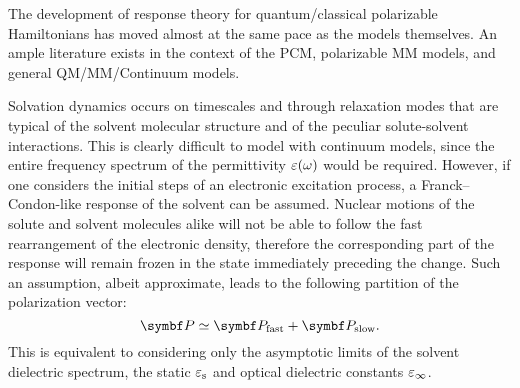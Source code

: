 The development of response theory for quantum/classical polarizable
Hamiltonians has moved almost at the same pace as the
models themselves.
An ample literature exists in the context of the
\acrshort{PCM},\autocite{Cammi1994-qj, Cammi1996-wf, Cammi1996-vx,
Cammi1999-rb, Cammi2003-qy, Frediani2005-nc, Ferrighi2010-pm}
polarizable \acrshort{MM} models,\autocite{Curutchet2009-bt, Olsen2010-wa,
Lipparini2012-hx, Lipparini2012-tl}
and general \acrshort{QM}/\acrshort{MM}/Continuum models.\autocite{Steindal2011-ki, Caprasecca2012-ir, Lipparini2013-ud}

 Solvation dynamics occurs on timescales and through
relaxation modes that are typical of the solvent molecular structure and of the
peculiar solute-solvent interactions.
This is clearly difficult to model with continuum models, since the
entire frequency spectrum of the permittivity $\varepsilon(\omega)$ would be
required.\autocite{Ingrosso2003-ev, Caricato2005-lo,
Mennucci2005-vi, Caricato2006-ba, Corni2015-pe}
However, if one considers the initial steps of an electronic excitation
process, a Franck--Condon-like response of the solvent can be assumed.
Nuclear motions of the solute and solvent molecules alike will not be able to
follow the fast rearrangement of the electronic density, therefore the
corresponding part of the response will remain frozen in the state
immediately preceding the change.
Such an assumption, albeit approximate, leads to the following partition
of the polarization vector:
\begin{equation}
 \vect{P} \simeq \vect{P}_\mathrm{fast} + \vect{P}_\mathrm{slow}.
\end{equation}
This is equivalent to considering only the asymptotic limits of the solvent
dielectric spectrum, \ie the static $\varepsilon_\mathrm{s}$ and optical
dielectric constants $\varepsilon_\infty$.\autocite{Aguilar1993-pu, Cammi1995-ah,
Cammi2005-tb, Corni2005-nd}

